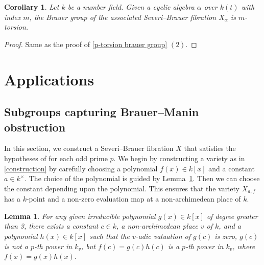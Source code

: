 \documentclass[11pt]{amsart}
\theoremstyle{plain}
\newtheorem{lemma}[thm]{Lemma}
\newtheorem{corollary}[thm]{Corollary}
\theoremstyle{definition}
\begin{document}
\begin{corollary}
    Let $k$ be a number field. Given a cyclic algebra $\alpha$ over $k(t)$ with index $m$, the Brauer group of the associated Severi--Brauer fibration $X_\alpha$ is $m$-torsion.  
\end{corollary}
\begin{proof}
    Same as the proof of \ref{p-torsion  brauer group} $(2)$.
\end{proof}

\section{Applications}\label{applications}
\subsection{Subgroups capturing Brauer--Manin obstruction}\label{subgroups capturing BMO}

In this section, we construct a Severi--Brauer fibration \(X\) that satisfies the hypotheses of  for each odd prime \( p \). We begin by constructing a variety  as in \ref{construction} by carefully choosing a polynomial $f(x) \in k[x]$ and a constant $a \in k^{\times}$. The choice of the polynomial is guided by Lemma~\ref{required polynomial}. Then we can choose the constant depending upon the polynomial. This ensures that the variety $X_{a,f}$ has a $k$-point and a non-zero evaluation map at a non-archimedean place of $k$.

\begin{lemma}\label{required polynomial}
    For any given irreducible polynomial $g(x)\in k[x]$ of degree greater than 3, there exists a constant $c\in k$, a non-archimedean place $v$ of $k$, and a polynomial $h(x)\in k[x]$ such that the $v$-adic valuation of $g(c)$ is zero, $g(c)$ is not a $p$-th power in $k_v$, but $f(c)=g(c)h(c)$ is a $p$-th power in $k_v$, where $f(x)=g(x)h(x)$.
\end{lemma}
\end{document}

